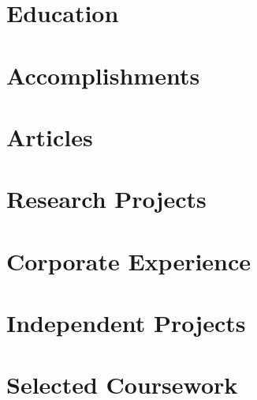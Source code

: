 \documentclass{prometheus_cv}
\begin{document}
\vspace*{-1cm}
\centering


\vspace*{0.4cm}
\section{Education}


\section{Accomplishments}


\section{Articles}


\section{Research Projects}


\section{Corporate Experience}



\section{Independent Projects}



\section{Selected Coursework}

\end{document}
